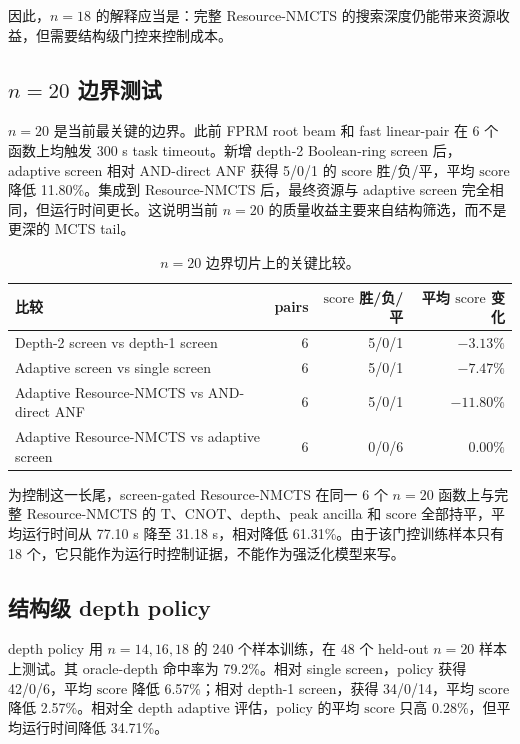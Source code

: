 \documentclass[UTF8,fontset=macnew,11pt]{ctexart}
\newcommand{\method}{Resource-NMCTS}
\newcommand{\score}{\ensuremath{\mathrm{score}}}
\newcommand{\cnot}{\ensuremath{\mathrm{CNOT}}}
\newcommand{\tcount}{\ensuremath{\mathrm{T}}}
\begin{document}
因此，$n=18$ 的解释应当是：完整 \method{} 的搜索深度仍能带来资源收益，但需要结构级门控来控制成本。

\subsection{\texorpdfstring{$n=20$}{n=20} 边界测试}

$n=20$ 是当前最关键的边界。此前 FPRM root beam 和 fast linear-pair 在 6 个函数上均触发 300 s task timeout。新增 depth-2 Boolean-ring screen 后，adaptive screen 相对 AND-direct ANF 获得 5/0/1 的 \score{} 胜/负/平，平均 \score{} 降低 11.80\%。集成到 \method{} 后，最终资源与 adaptive screen 完全相同，但运行时间更长。这说明当前 $n=20$ 的质量收益主要来自结构筛选，而不是更深的 MCTS tail。

\begin{table}[t]
\centering
\small
\caption{$n=20$ 边界切片上的关键比较。}
\label{tab:n20_key}
\begin{tabularx}{\linewidth}{>{\raggedright\arraybackslash}Xrrr}
\toprule
比较 & pairs & \score{} 胜/负/平 & 平均 \score{} 变化 \\
\midrule
Depth-2 screen vs depth-1 screen & 6 & 5/0/1 & $-3.13\%$ \\
Adaptive screen vs single screen & 6 & 5/0/1 & $-7.47\%$ \\
Adaptive \method{} vs AND-direct ANF & 6 & 5/0/1 & $-11.80\%$ \\
Adaptive \method{} vs adaptive screen & 6 & 0/0/6 & $0.00\%$ \\
\bottomrule
\end{tabularx}
\end{table}

为控制这一长尾，screen-gated \method{} 在同一 6 个 $n=20$ 函数上与完整 \method{} 的 \tcount{}、\cnot{}、depth、peak ancilla 和 \score{} 全部持平，平均运行时间从 77.10 s 降至 31.18 s，相对降低 61.31\%。由于该门控训练样本只有 18 个，它只能作为运行时控制证据，不能作为强泛化模型来写。

\subsection{结构级 depth policy}

depth policy 用 $n=14,16,18$ 的 240 个样本训练，在 48 个 held-out $n=20$ 样本上测试。其 oracle-depth 命中率为 79.2\%。相对 single screen，policy 获得 42/0/6，平均 \score{} 降低 6.57\%；相对 depth-1 screen，获得 34/0/14，平均 \score{} 降低 2.57\%。相对全 depth adaptive 评估，policy 的平均 \score{} 只高 0.28\%，但平均运行时间降低 34.71\%。
\end{document}

